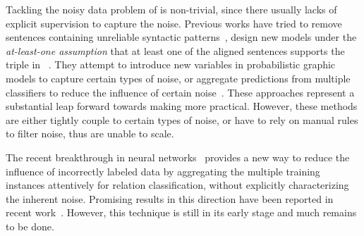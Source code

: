 Tackling the noisy data problem of \DS is non-trivial, since there usually lacks of explicit supervision to capture the noise.
Previous works have tried to remove sentences containing unreliable syntactic patterns~\cite{takamatsu2012reducing}, design new models under the
\textit{at-least-one assumption}
that at least one of the aligned sentences supports the triple in \KB~\cite{riedel2010modeling}. They attempt to introduce new variables in probabilistic graphic models to capture certain types of noise, or aggregate predictions from multiple classifiers to reduce the influence of certain noise~\cite{hoffmann2011knowledge,surdeanu2012multi,ritter2013modeling,min2013distant}. These approaches represent a substantial leap forward towards making \DS more practical. However, these methods are either tightly couple to certain types of noise,
or have to rely on manual rules to filter noise, thus are unable to scale.

The recent breakthrough in neural networks~\cite{lin2016neural} provides a new way to reduce the influence of incorrectly labeled data by aggregating the multiple training instances attentively for relation classification, without explicitly characterizing the inherent noise. 
Promising results in this direction have been reported in recent work~\red{\cite{}}. However, this technique is still in its early stage and much remains to be done.


